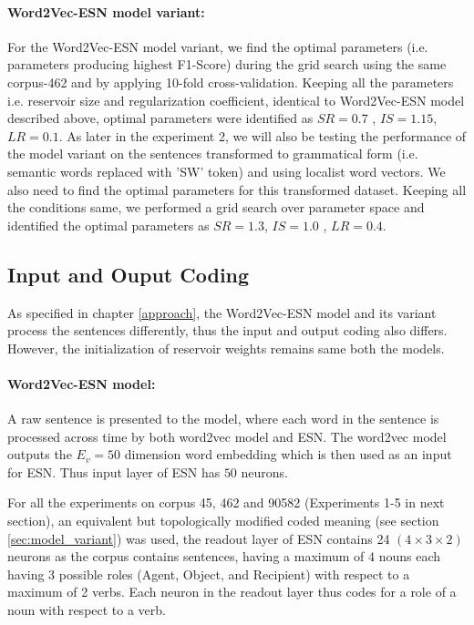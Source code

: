\paragraph{Word2Vec-ESN model variant: } For the Word2Vec-ESN model variant, we find the optimal parameters (i.e. parameters producing highest F1-Score) during the grid search using the same corpus-462 and by applying 10-fold cross-validation. Keeping all the parameters i.e. reservoir size and regularization coefficient, identical to Word2Vec-ESN model described above, optimal parameters were identified as $SR = 0.7$ , $IS = 1.15$, $LR = 0.1$. As later in the experiment 2, we will also be testing the performance of the model variant on the sentences transformed to grammatical form (i.e. semantic words replaced with 'SW' token) and using localist word vectors. We also need to find the optimal parameters for this transformed dataset. Keeping all the conditions same, we performed a grid search over parameter space and identified the optimal parameters as $SR = 1.3$, $IS = 1.0$ , $LR = 0.4$. 

\subsection{Input and Ouput Coding}

As specified in chapter \ref{approach}, the Word2Vec-ESN model and its variant process the sentences differently, thus the input and output coding also differs. However, the initialization of reservoir weights remains same both the models. 

\paragraph{Word2Vec-ESN model:}

A raw sentence is presented to the model, where each word in the sentence is processed across time by both word2vec model and ESN. The word2vec model outputs the $E_{v} = 50$ dimension word embedding which is then used as an input for ESN. Thus input layer of ESN has $50$ neurons.

For all the experiments on corpus 45, 462 and 90582 (Experiments 1-5 in next section), an equivalent but topologically modified coded meaning (see section \ref{sec:model_variant}) was used, the readout layer of ESN contains 24 $(4 \times 3 \times 2)$ neurons as the corpus contains sentences, having a maximum of 4 nouns each having 3 possible roles (Agent, Object, and Recipient) with respect to a maximum of 2 verbs. Each neuron in the readout layer thus codes for a role of a noun with respect to a verb.


